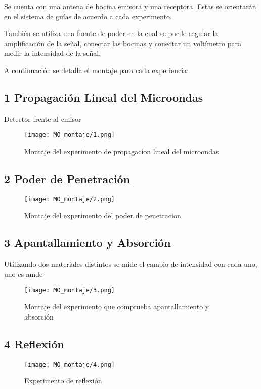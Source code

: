 \documentclass[a4paper,twocolumn,10pt]{article}
\begin{document}
Se cuenta con una antena de bocina emisora y una receptora. Estas se orientarán en el sistema de guías de acuerdo a cada experimento.

También se utiliza una fuente de poder en la cual se puede regular la amplificación de la señal, conectar las bocinas y conectar un voltímetro para medir la intensidad de la señal.

A continuación se detalla el montaje para cada experiencia:

\subsection*{1 Propagación Lineal del Microondas}
Detector frente al emisor
\begin{figure}[H]
    \centering
    \texttt{[image: MO\_montaje/1.png]}
    \caption{Montaje del experimento de propagacion lineal del microondas}
    \label{fig:proplineal}
\end{figure}

\subsection*{2 Poder de Penetración}

\begin{figure}[H]
    \centering
    \texttt{[image: MO\_montaje/2.png]}
    \caption{Montaje del experimento del poder de penetracion}
    \label{fig:montpen}
\end{figure}

\subsection*{3 Apantallamiento y Absorción}
Utilizando dos materiales distintos se mide el cambio de intensidad con cada uno, uno es amde
\begin{figure}[H]
    \centering
    \texttt{[image: MO\_montaje/3.png]}
    \caption{Montaje del experimento que comprueba apantallamiento y absorción}
    \label{fig:montapant}
\end{figure}

\subsection*{4 Reflexión}

\begin{figure}[H]
    \centering
    \texttt{[image: MO\_montaje/4.png]}
    \caption{Experimento de reflexión}
    \label{fig:montreflex}
\end{figure}
\end{document}
